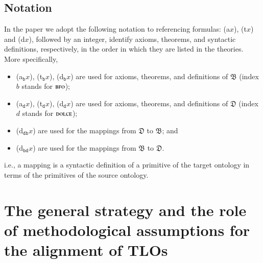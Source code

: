 \documentclass[ao]{iosart2x}
\newcommand{\nb}[1]{\textcolor{red}{$|$}\marginpar{\hspace*{-0cm}\parbox{20mm}{\scriptsize\raggedright\textcolor{red}{#1}}}}
\newcommand{\bfoAxLabel}{\textrm{a$_\texttt{b}$}}
\newcommand{\bfoDefLabel}{\textrm{d$_\texttt{b}$}}
\newcommand{\bfoThrLabel}{\textrm{t$_\texttt{b}$}}
\newcommand{\dolceAxLabel}{\textrm{a$_\texttt{d}$}}
\newcommand{\dolceDefLabel}{\textrm{d$_\texttt{d}$}}
\newcommand{\dolceThrLabel}{\textrm{t$_\texttt{d}$}}
\newcommand{\dbDefLabel}{\textrm{d$_\texttt{db}$}}
\newcommand{\dbThrLabel}{\textrm{t$_\texttt{db}$}}
\newcommand{\dbAxLabel}{\textrm{a}$_\texttt{db}$}
\newcommand{\bdDefLabel}{\textrm{d$_\texttt{bd}$}}
\newcommand{\bdThrLabel}{\textrm{t$_\texttt{bd}$}}
\newcommand{\bdAxLabel}{\textrm{a}$_\texttt{bd}$}
\newcommand{\dolce}{{\textsc{dolce}}}
\newcommand{\bfo}{{\textsc{bfo}}}
\newcommand {\thdolce} {\ensuremath{\mathfrak{D}}}
\newcommand {\thbfo} {\ensuremath{\mathfrak{B}}}
\begin{document}
\subsection{Notation}
In the paper we adopt the following notation to referencing formulas: ({\rm a}$x$), ({\rm t}$x$) and ({\rm d}$x$), followed by an integer, identify axioms, theorems, and syntactic definitions, respectively, in the order in which they are listed in the theories. More specifically,
\begin{itemize}
\item (\bfoAxLabel $x$), (\bfoThrLabel $x$), (\bfoDefLabel $x$) are used for axioms, theorems, and definitions of $\thbfo$ (index $b$ stands for $\bfo$); 
\item (\dolceAxLabel $x$), (\dolceThrLabel $x$), (\dolceDefLabel $x$) are used for axioms, theorems, and definitions of {$\thdolce$} (index $d$ stands for $\dolce$); 
\item %
(\dbDefLabel $x$) are used for the %
mappings  from ${\thdolce}$ to ${\thbfo}$; and
\item %
(\bdDefLabel $x$) are used for the  %
 mappings  from ${\thbfo}$ to ${\thdolce}$.  
\end{itemize}
i.e., a mapping is a syntactic definition of a primitive of the target ontology in terms of the primitives of the source ontology.


\section{The general strategy and the role of methodological assumptions for the alignment of TLOs}\label{sect_methodology}

\end{document}
